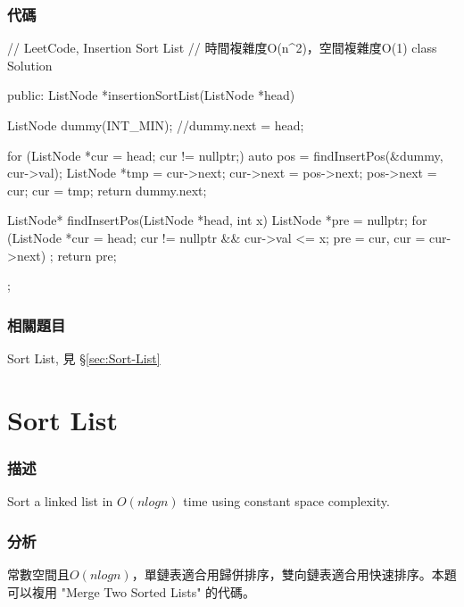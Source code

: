 \subsubsection{代碼}
\begin{Code}
// LeetCode, Insertion Sort List
// 時間複雜度O(n^2)，空間複雜度O(1)
class Solution {
public:
    ListNode *insertionSortList(ListNode *head) {
        ListNode dummy(INT_MIN);
        //dummy.next = head;

        for (ListNode *cur = head; cur != nullptr;) {
            auto pos = findInsertPos(&dummy, cur->val);
            ListNode *tmp = cur->next;
            cur->next = pos->next;
            pos->next = cur;
            cur = tmp;
        }
        return dummy.next;
    }

    ListNode* findInsertPos(ListNode *head, int x) {
        ListNode *pre = nullptr;
        for (ListNode *cur = head; cur != nullptr && cur->val <= x;
            pre = cur, cur = cur->next)
            ;
        return pre;
    }
};
\end{Code}


\subsubsection{相關題目}
\begindot
\item Sort List, 見 \S \ref{sec:Sort-List}
\myenddot


\section{Sort List} %
\label{sec:sort-list}


\subsubsection{描述}
Sort a linked list in $O(n log n)$ time using constant space complexity.


\subsubsection{分析}
常數空間且$O(nlogn)$，單鏈表適合用歸併排序，雙向鏈表適合用快速排序。本題可以複用 "Merge Two Sorted Lists" 的代碼。


